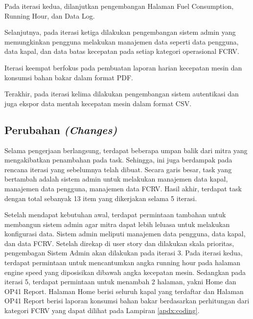 

Pada iterasi kedua, dilanjutkan pengembangan Halaman Fuel Consumption, Running Hour, dan Data Log.



Selanjutnya, pada iterasi ketiga dilakukan pengembangan sistem admin yang memungkinkan pengguna melakukan manajemen data seperti data pengguna, data kapal, dan data batas kecepatan pada setiap kategori operasional FCRV.



Iterasi keempat berfokus pada pembuatan laporan harian kecepatan mesin dan konsumsi bahan bakar dalam format PDF.



Terakhir, pada iterasi kelima dilakukan pengembangan sistem autentikasi dan juga ekspor data mentah kecepatan mesin dalam format CSV.



\subsection{Perubahan \textit{(Changes)}}

Selama pengerjaan berlangsung, terdapat beberapa umpan balik dari mitra yang mengakibatkan penambahan pada task. Sehingga, ini juga berdampak pada rencana iterasi yang sebelumnya telah dibuat. Secara garis besar, task yang bertambah adalah sistem admin untuk melakukan manajemen data kapal, manajemen data pengguna, manajemen data FCRV. Hasil akhir, terdapat task dengan total sebanyak 13 item yang dikerjakan selama 5 iterasi.



Setelah mendapat kebutuhan awal, terdapat permintaan tambahan untuk membangun sistem admin agar mitra dapat lebih leluasa untuk melakukan konfigurasi data. Sistem admin meliputi manajemen data pengguna, data kapal, dan data FCRV. Setelah direkap di user story dan dilakukan skala prioritas, pengembagan Sistem Admin akan dilakukan pada iterasi 3.
Pada iterasi kedua, terdapat permintaan untuk mencantumkan angka running hour pada halaman engine speed yang diposisikan dibawah angka kecepatan mesin. Sedangkan pada iterasi 5, terdapat permintaan untuk menambah 2 halaman, yakni Home dan OP41 Report. Halaman Home berisi seluruh kapal yang terdaftar dan Halaman OP41 Report berisi laporan konsumsi bahan bakar berdasarkan perhitungan dari kategori FCRV yang dapat dilihat pada Lampiran \ref{apdx:coding}.


